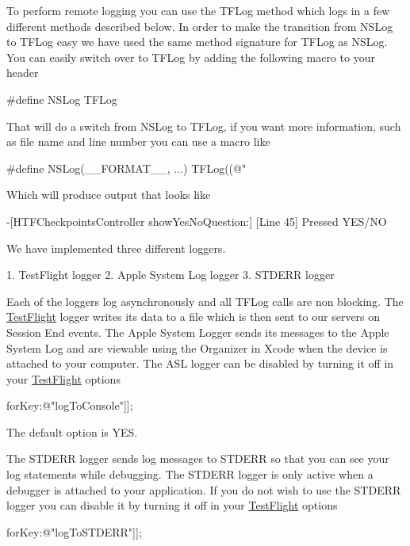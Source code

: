 To perform remote logging you can use the T\-F\-Log method which logs in a few different methods described below. In order to make the transition from N\-S\-Log to T\-F\-Log easy we have used the same method signature for T\-F\-Log as N\-S\-Log. You can easily switch over to T\-F\-Log by adding the following macro to your header \begin{DoxyVerb}#define NSLog TFLog
\end{DoxyVerb}


That will do a switch from N\-S\-Log to T\-F\-Log, if you want more information, such as file name and line number you can use a macro like \begin{DoxyVerb}#define NSLog(__FORMAT__, ...) TFLog((@"%
\end{DoxyVerb}


Which will produce output that looks like \begin{DoxyVerb}-[HTFCheckpointsController showYesNoQuestion:] [Line 45] Pressed YES/NO
\end{DoxyVerb}


We have implemented three different loggers. \begin{DoxyVerb}1. TestFlight logger
2. Apple System Log logger
3. STDERR logger
\end{DoxyVerb}


Each of the loggers log asynchronously and all T\-F\-Log calls are non blocking. The \hyperlink{interface_test_flight}{Test\-Flight} logger writes its data to a file which is then sent to our servers on Session End events. The Apple System Logger sends its messages to the Apple System Log and are viewable using the Organizer in Xcode when the device is attached to your computer. The A\-S\-L logger can be disabled by turning it off in your \hyperlink{interface_test_flight}{Test\-Flight} options \begin{DoxyVerb}[TestFlight setOptions:[NSDictionary dictionaryWithObject:[NSNumber numberWithBool:NO] forKey:@"logToConsole"]];
\end{DoxyVerb}


The default option is Y\-E\-S.

The S\-T\-D\-E\-R\-R logger sends log messages to S\-T\-D\-E\-R\-R so that you can see your log statements while debugging. The S\-T\-D\-E\-R\-R logger is only active when a debugger is attached to your application. If you do not wish to use the S\-T\-D\-E\-R\-R logger you can disable it by turning it off in your \hyperlink{interface_test_flight}{Test\-Flight} options \begin{DoxyVerb}[TestFlight setOptions:[NSDictionary dictionaryWithObject:[NSNumber numberWithBool:NO] forKey:@"logToSTDERR"]];
\end{DoxyVerb}


